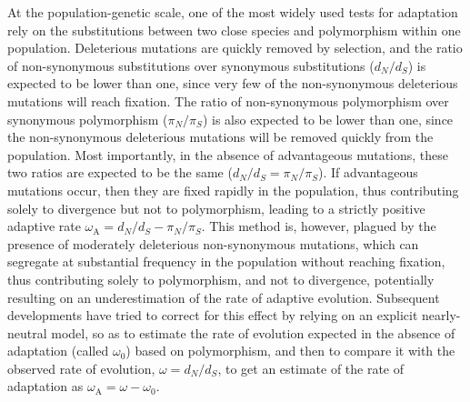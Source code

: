 \documentclass{article}
\newcommand{\dn}{d_N}
\newcommand{\ds}{d_S}
\newcommand{\dnds}{\dn / \ds}
\newcommand{\rateApop}{\omega_{\mathrm{A}}}
\newcommand{\pn}{\pi_N}
\newcommand{\ps}{\pi_S}
\newcommand{\pnps}{\pn / \ps}
\begin{document}
    At the population-genetic scale, one of the most widely used tests for adaptation rely on the substitutions between two close species and polymorphism within one population\cite{mcdonald_adaptative_1991}.
    Deleterious mutations are quickly removed by selection, and the ratio of non-synonymous substitutions over synonymous substitutions ($\dnds$) is expected to be lower than one, since very few of the non-synonymous deleterious mutations will reach fixation.
    The ratio of non-synonymous polymorphism over synonymous polymorphism ($\pnps$) is also expected to be lower than one, since the non-synonymous deleterious mutations will be removed quickly from the population.
    Most importantly, in the absence of advantageous mutations, these two ratios are expected to be the same ($\dnds=\pnps$).
    If advantageous mutations occur, then they are fixed rapidly in the population, thus contributing solely to divergence but not to polymorphism, leading to a strictly positive adaptive rate $\rateApop = \dnds-\pnps$\cite{smith_adaptive_2002}.
    This method is, however, plagued by the presence of moderately deleterious non-synonymous mutations, which can segregate at substantial frequency in the population without reaching fixation, thus contributing solely to polymorphism, and not to divergence, potentially resulting on an underestimation of the rate of adaptive evolution\cite{eyre-walker_quantifying_2002}.
    Subsequent developments have tried to correct for this effect by relying on an explicit nearly-neutral model\cite{eyre-walker_estimating_2009, galtier_adaptive_2016}, so as to estimate the rate of evolution expected in the absence of adaptation (called $\omega_0$) based on polymorphism, and then to compare it with the observed rate of evolution, $\omega=\dnds$, to get an estimate of the rate of adaptation as $\rateApop = \omega-\omega_0$.
\end{document}
